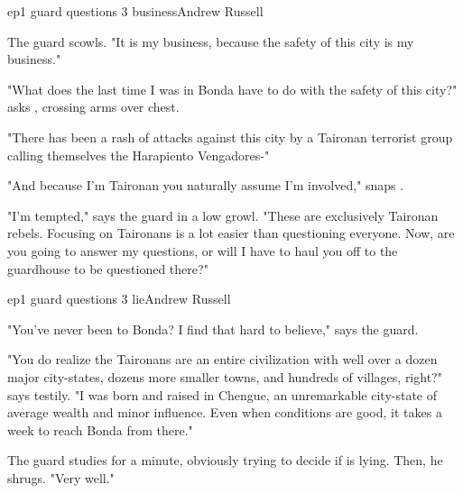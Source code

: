 \documentclass{book}
\begin{document}
\begin{childnode}{ep1 guard questions 3 business}{Andrew Russell}

The guard scowls. "It is my business, because the safety of this city is my business."

"What does the last time I was in Bonda have to do with the safety of this city?" asks \name{}, crossing \hisher{} arms over \hisher{} chest.

"There has been a rash of attacks against this city by a Taironan terrorist group calling themselves the Harapiento Vengadores-"

"And because I'm Taironan you naturally assume I'm involved," snaps \name{}.

"I'm tempted," says the guard in a low growl. "These are exclusively Taironan rebels. Focusing on Taironans is a lot easier than questioning everyone. Now, are you going to answer my questions, or 
will I have to haul you off to the guardhouse to be questioned there?"




\end{childnode}

\begin{childnode}{ep1 guard questions 3 lie}{Andrew Russell}


"You've never been to Bonda? I find that hard to believe," says the guard.

"You do realize the Taironans are an entire civilization with well over a dozen major city-states, dozens more smaller towns, and hundreds of villages, right?" says \name{} testily. "I was born and 
raised in Chengue, an unremarkable city-state of average wealth and minor influence. Even when conditions are good, it takes a week to reach Bonda from there."

The guard studies \name{} for a minute, obviously trying to decide if \heshe{} is lying. Then, he shrugs. "Very well."


\end{childnode}
\end{document}
